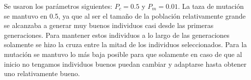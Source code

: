 \documentclass[11pt,letterpaper]{article}
\begin{document}
\begin{enumerate}[label=\alph*)]
        Se usaron los parámetros siguientes: $P_c = 0.5$ y $P_m = 0.01$. La taza de mutación se mantuvo en 0.5, ya que al ser el tamaño de la población relativamente grande se alcanzaba a generar muy buenos individuos casi desde las primeras generaciones. Para mantener estos individuos a lo largo de las generaciones solamente se hizo la cruza entre la mitad de los individuos seleccionados. Para la mutación se mantuvo lo más baja posible para que solamente en caso de que al inicio no tengamos individuos buenos puedan cambiar y adaptarse hasta obtener uno relativamente bueno.
    \end{enumerate}
\end{document}
